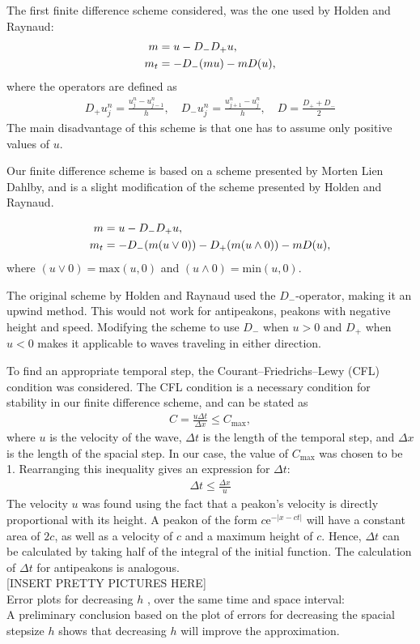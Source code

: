 The first finite difference scheme considered, was the one used by Holden and Raynaud: \cite{holden2006convergence}
\begin{align}
m &= u - D_{-}D_{+}u, \notag \\ 
m_t &= -D_{-}(mu) - mD(u),
\end{align}
where the operators are defined as
\begin{align}
\label{eq:operators}
D_{+}u_{j}^{n} = \frac{u_{j}^{n}-u_{j-1}^{n}}{h},\quad
D_{-}u_{j}^{n} = \frac{u_{j+1}^{n}-u_{j}^{n}}{h},\quad
D = \frac{D_{+}+D_{-}}{2}
\end{align}
The main disadvantage of this scheme is that one has to assume only positive values of $u$.

Our finite difference scheme is based on a scheme presented by Morten Lien Dahlby\cite{dahlby2007geometric}, and is a slight modification of the scheme presented by Holden and Raynaud.

\begin{align}
m &= u - D_{-}D_{+}u, \notag \\ 
m_t &= -D_{-}(m(u \vee 0)) -D_{+}(m(u \wedge 0)) - mD(u), 
\end{align}
where $(u \vee 0) = \text{max}(u,0)$ and $(u \wedge 0) = \text{min}(u,0)$.

The original scheme by Holden and Raynaud used the $D_{-}$-operator, making it an upwind method. This would not work for antipeakons, peakons with negative height and speed. Modifying the scheme to use  $D_{-}$ when $u > 0$ and $D_{+}$ when $ u < 0$ makes it applicable to waves traveling in either direction. 

To find an appropriate temporal step, the Courant–Friedrichs–Lewy (CFL) condition was considered. The CFL condition is a necessary condition for stability in our finite difference scheme, and can be stated as
\begin{align}
C = \frac{u\Delta t}{\Delta x} \leq C_{\text{max}},
\end{align}
where $u$ is the velocity of the wave, $\Delta t$ is the length of the temporal step, and $\Delta x$ is the length of the spacial step. In our case, the value of $C_{\text{max}}$ was chosen to be 1. Rearranging this inequality gives an expression for $\Delta t$:
\begin{align}
\Delta t \leq \frac{\Delta x}{u}
\end{align}
The velocity $u$ was found using the fact that a peakon's velocity is directly proportional with its height. A peakon of the form $c\text{e}^{-|x-ct|}$ will have a constant area of $2c$, as well as a velocity of $c$ and a maximum height of $c$. Hence, $\Delta t$ can be calculated by taking half of the integral of the initial function. The calculation of $\Delta t$ for antipeakons is analogous. \\

[INSERT PRETTY PICTURES HERE]\\

Error plots for decreasing $h$ , over the same time and space interval:\\
A preliminary conclusion based on the plot of errors for decreasing the spacial stepsize $h$ shows that decreasing $h$ will improve the approximation.


